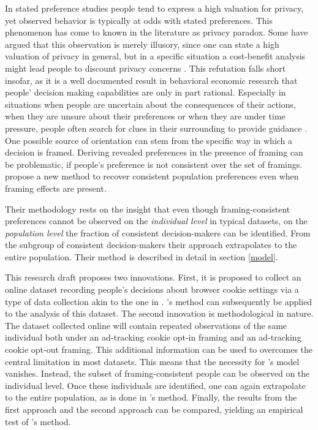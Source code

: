 

In stated preference studies people tend to express a high valuation for privacy, yet observed behavior is typically at odds with stated preferences.
This phenomenon has come to known in the literature as privacy paradox. Some have argued that this observation is 
merely illusory, since one can state a high valuation of privacy in general, but in a specific situation a cost-benefit analysis might 
lead people to discount privacy concerns \parencite[p. 2]{acquisti2015privacy}. This refutation falls short insofar, as it is a well documented result in behavioral economic research that people'
decision making capabilities are only in part rational. Especially in situations when people are uncertain about the consequences of their actions, when they are unsure about their preferences or when they 
are under time pressure, people often search for clues in their surrounding to provide guidance \parencite[p. 3]{acquisti2015privacy}. One possible source of 
orientation can stem from the specific way in which a decision is framed. Deriving revealed preferences in the presence of framing can be problematic, if people's preference 
is not consistent over the set of framings. \textcite{goldin2020} propose a new method to recover consistent population preferences even when framing effects are present. 

Their methodology rests on the insight that even though framing-consistent preferences cannot be observed on the \textit{individual level} in typical datasets, 
on the \textit{population level} the fraction of consistent decision-makers can be identified. From the subgroup of consistent decision-makers their approach
extrapolates to the entire population. Their method is described in detail in section \ref{model}.

This research draft proposes two innovations. First, it is proposed to collect an online dataset recording people's decisions about browser cookie settings via a type of data collection
akin to the one in \textcite{levy2020}. \textcite{goldin2020}'s method can subsequently be applied to the analysis of this dataset. The second innovation is methodological in nature.
The dataset collected online will contain repeated observations of the same individual both under an ad-tracking cookie opt-in framing and an ad-tracking cookie opt-out framing. 
This additional information can be used to overcomes the central limitation in most datasets. This means that the necessity for \textcite{goldin2020}'s model vanishes. 
Instead, the subset of framing-consistent people can be observed on the individual level. Once these individuals are identified, one can again extrapolate to the entire population, as
is done in \textcite{goldin2020}'s method. Finally, the results from the first approach and the second approach can be compared, yielding an empirical test of 
\textcite{goldin2020}'s method.

